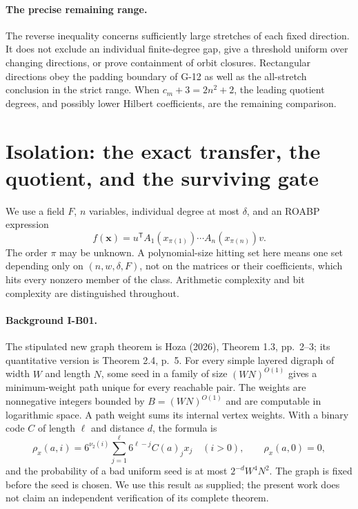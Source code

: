 \documentclass[11pt,a4paper]{article}
\theoremstyle{definition}\newtheorem{definition}{Definition}
\begin{document}
\paragraph{The precise remaining range.}
The reverse inequality concerns sufficiently large stretches of
each fixed direction. It does not exclude an individual
finite-degree gap, give a threshold uniform over changing
directions, or prove containment of orbit closures. Rectangular
directions obey the padding boundary of G-12 as well as the
all-stretch conclusion in the strict range. When
$c_m+3=2n^2+2$, the leading quotient degrees, and
possibly lower Hilbert coefficients, are the remaining comparison.




\section{Isolation: the exact transfer, the quotient, and the surviving gate}
\label{sec:isolation-track}

We use a field $F$, $n$ variables, individual degree at most $\delta$, and
an ROABP expression
\[
 f(\mathbf x)=u^{\mathsf T}A_1(x_{\pi(1)})\cdots A_n(x_{\pi(n)})v.
\]
The order $\pi$ may be unknown.  A polynomial-size hitting set here means
one set depending only on $(n,w,\delta,F)$, not on the matrices or their
coefficients, which hits every nonzero member of the class.  Arithmetic
complexity and bit complexity are distinguished throughout.

\paragraph{Background I-B01.}
The stipulated new graph theorem is Hoza (2026), Theorem 1.3, pp.~2--3;
its quantitative version is Theorem 2.4, p.~5.  For every simple layered
digraph of width $W$ and length $N$, some seed in a family of size
$(WN)^{O(1)}$ gives a minimum-weight path unique for every reachable pair.
The weights are nonnegative integers bounded by $B=(WN)^{O(1)}$ and are
computable in logarithmic space.  A path weight sums its internal vertex
weights.  With a binary code $C$ of length $\ell$ and distance $d$, the
formula is
\[
 \rho_x(a,i)=6^{\nu_2(i)}\sum_{j=1}^{\ell}6^{\ell-j}C(a)_j x_j
 \quad(i>0),\qquad \rho_x(a,0)=0,
\tag{I.1}\label{eq:I-hoza}
\]
and the probability of a bad uniform seed is at most
$2^{-d}W^4N^2$.  The graph is fixed before the seed is chosen.
We use this result as supplied; the present work does not claim an
independent verification of its complete theorem.
\end{document}
